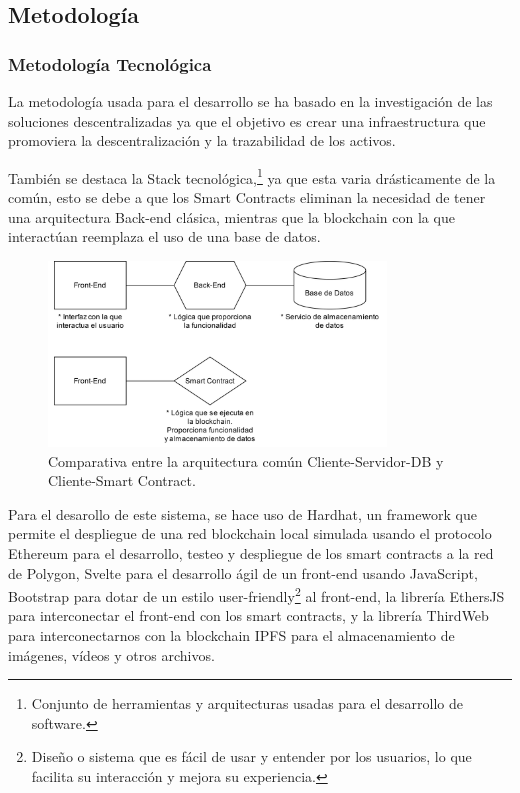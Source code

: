 \subsection{Metodología}
\subsubsection{Metodología Tecnológica}

La metodología usada para el desarrollo se ha basado en la investigación de las soluciones descentralizadas ya que el objetivo es crear una infraestructura que promoviera la descentralización y la trazabilidad de los activos.

\bigskip

También se destaca  la Stack tecnológica,\footnote{Conjunto de herramientas y arquitecturas usadas para el desarrollo de software.} ya que esta varia drásticamente de la común, esto se debe a que los Smart Contracts eliminan la necesidad de tener una arquitectura Back-end clásica, mientras que la blockchain con la que interactúan reemplaza el uso de una base de datos.

\begin{figure}[H]
        \centering
        \includegraphics[width=0.8\textwidth]{img/diagramas/metodologia.png}
        \caption{Comparativa entre la arquitectura común Cliente-Servidor-DB y Cliente-Smart Contract.}
        \label{fig:configApi}
\end{figure}

\bigskip

Para el desarollo de este sistema, se hace uso de Hardhat, un framework que permite el despliegue de una red blockchain local simulada usando el protocolo Ethereum para el desarrollo, testeo y despliegue de los smart contracts a la red de Polygon, Svelte para el desarrollo ágil de un front-end usando JavaScript, Bootstrap para dotar de un estilo user-friendly\footnote{Diseño o sistema que es fácil de usar y entender por los usuarios, lo que facilita su interacción y mejora su experiencia.} al front-end, la librería EthersJS para interconectar el front-end con los smart contracts, y la librería ThirdWeb para interconectarnos con la blockchain IPFS para el almacenamiento de imágenes, vídeos y otros archivos.

